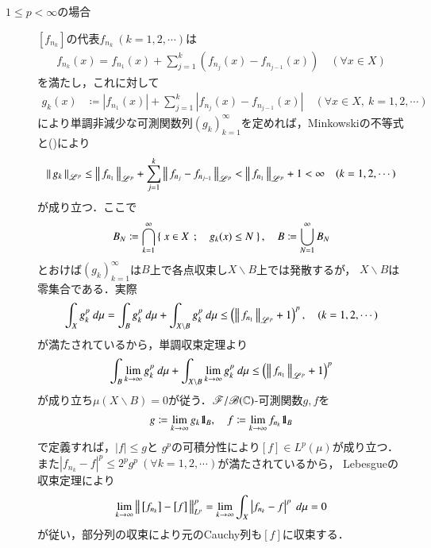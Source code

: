 \begin{prf}
\begin{description}
		\item[$1 \leq p < \infty$の場合]
			$\left[f_{n_k}\right]$の代表$f_{n_k}\ (k=1,2,\cdots)$は
			\begin{align}	
				f_{n_k}(x) = f_{n_1}(x) + \sum_{j=1}^{k}\left( f_{n_j}(x) - f_{n_{j-1}}(x) \right) \quad (\forall x \in X)
				\label{eq:Lp_banach_3}
			\end{align}
			を満たし，これに対して
			\begin{align}
				g_k(x) &\coloneqq \left| f_{n_1}(x) \right| + \sum_{j=1}^{k} \left| f_{n_j}(x) - f_{n_{j-1}}(x) \right|
				\quad (\forall x \in X,\ k=1,2,\cdots)
			\end{align}
			により単調非減少な可測関数列$(g_k)_{k=1}^{\infty}$を定めれば，Minkowskiの不等式と()により
			\begin{align}
				\left\|\, g_k\, \right\|_{\mathscr{L}^p} \leq \left\|\, f_{n_1}\, \right\|_{\mathscr{L}^p} + \sum_{j=1}^{k}\left\|\, f_{n_j} - f_{n_{j-1}}\, \right\|_{\mathscr{L}^p}
				< \left\|\, f_{n_1}\, \right\|_{\mathscr{L}^p} + 1 < \infty
				\quad (k = 1,2,\cdots)
				\label{eq:thm_Lp_banach_1}
			\end{align}
			が成り立つ．ここで
			\begin{align}
				B_N \coloneqq \bigcap_{k=1}^{\infty} \left\{\ x \in X\ \, ; \quad g_k(x) \leq N\ \right\},
				\quad B \coloneqq \bigcup_{N=1}^{\infty} B_N
			\end{align}
			とおけば$(g_k)_{k=1}^{\infty}$は$B$上で各点収束し$X \backslash B$上では発散するが，
			$X \backslash B$は零集合である．実際
			\begin{align}
				\int_X g_k^p\ d\mu
				= \int_B g_k^p\ d\mu + \int_{X \backslash B} g_k^p\ d\mu
				\leq \left( \left\|\, f_{n_1}\, \right\|_{\mathscr{L}^p} + 1 \right)^p,
				\quad (k=1,2,\cdots)
			\end{align}
			が満たされているから，単調収束定理より
			\begin{align}
				\int_B \lim_{k \to \infty} g_k^p\ d\mu + \int_{X \backslash B} \lim_{k \to \infty} g_k^p\ d\mu
				\leq \left( \left\|\, f_{n_1}\, \right\|_{\mathscr{L}^p} + 1 \right)^p
			\end{align}
			が成り立ち$\mu(X \backslash B) = 0$が従う．$\mathscr{F}/\mathscr{B}(\mathbb{C})$-可測関数$g,f$を
			\begin{align}
				g \coloneqq \lim_{k \to \infty} g_k \mbox{1}\hspace{-0.25em}\mbox{l}_B,
				\quad f \coloneqq \lim_{k \to \infty} f_{n_k} \mbox{1}\hspace{-0.25em}\mbox{l}_B
			\end{align}
			で定義すれば，$|f| \leq g$と
			$g^p$の可積分性により$\left[f\right] \in L^p(\mu)$が成り立つ．
			また$\left|f_{n_k} - f\right|^p \leq 2^p g^p\ (\forall k=1,2,\cdots)$が満たされているから，
			Lebesgueの収束定理により
			\begin{align}
				\lim_{k \to \infty}\left\|\, \left[f_{n_k}\right] - \left[f\right]\, \right\|_{L^p}^p
				= \lim_{k \to \infty} \int_X \left| f_{n_k} - f \right|^p\ d\mu = 0
			\end{align}
			が従い，部分列の収束により元のCauchy列も$\left[f\right]$に収束する．
			\QED
	\end{description}
\end{prf}
